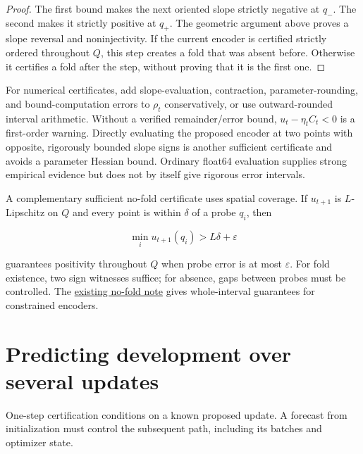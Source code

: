 \documentclass[11pt]{article}
\begin{document}
\begin{proof} The first bound makes the next oriented slope strictly
negative at \(q_-\). The second makes it strictly positive at \(q_+\).
The geometric argument above proves a slope reversal and noninjectivity.
If the current encoder is certified strictly ordered throughout \(Q\),
this step creates a fold that was absent before. Otherwise it certifies
a fold after the step, without proving that it is the first one.
\end{proof}

For numerical certificates, add slope-evaluation, contraction,
parameter-rounding, and bound-computation errors to \(\rho_t\)
conservatively, or use outward-rounded interval arithmetic. Without a
verified remainder/error bound, \(u_t-\eta_t C_t<0\) is a first-order
warning. Directly evaluating the proposed encoder at two points with
opposite, rigorously bounded slope signs is another sufficient
certificate and avoids a parameter Hessian bound. Ordinary float64
evaluation supplies strong empirical evidence but does not by itself
give rigorous error intervals.

\begin{samepage}
A complementary sufficient no-fold certificate uses spatial coverage. If
\(u_{t+1}\) is \(L\)-Lipschitz on \(Q\) and every point is within
\(\delta\) of a probe \(q_i\), then

\begin{equation}\label{eq:no-fold}
\min_i u_{t+1}(q_i)>L\delta+\varepsilon
\end{equation}

guarantees positivity throughout \(Q\) when probe error is at most
\(\varepsilon\). For fold existence, two sign witnesses suffice; for
absence, gaps between probes must be controlled. The
\href{https://github.com/c-tustin/JEPA-Identifiability-Predictive-Subspaces/blob/main/icm-folding/no-fold-proof/no-fold.tex}{existing no-fold note} gives
whole-interval guarantees for constrained encoders.
\end{samepage}

\section{Predicting development over several
updates}\label{predicting-development-over-several-updates}

One-step certification conditions on a known proposed update. A forecast
from initialization must control the subsequent path, including its
batches and optimizer state.
\end{document}
